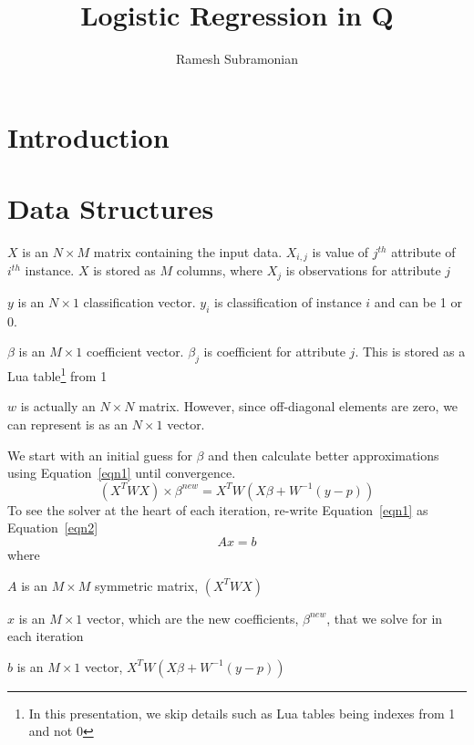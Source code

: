 \documentclass[12pt,timesnewroman,letterpaper]{article}
\begin{document}
\title{Logistic Regression in Q}
\author{ Ramesh Subramonian }
\maketitle
\thispagestyle{fancy}
\cfoot{}
\rfoot{{\small \thepage}}

\section{Introduction}

\TBC

\section{Data Structures}

\bi
\item \(X\) is an \(N \times M\) matrix containing the input data.
  \(X_{i, j}\) is value of \(j^{th}\) attribute of \(i^{th}\)
  instance. \(X\) is stored as \(M\) columns, where \(X_j\) is
  observations for attribute \(j\)
\item \(y\) is an \(N \times 1\) classification vector. \(y_i\) is
  classification of instance \(i\) and can be 1 or 0.
\item \(\beta\) is an \(M \times 1\) coefficient vector. \(\beta_j\)
  is coefficient for attribute \(j\). This is stored as a Lua table\footnote{In
    this presentation, we skip details such as Lua tables being indexes from 1
  and not 0}
  from 1
\item \(w\) is actually an \(N \times N\) matrix. However, since
  off-diagonal elements are zero, we can represent is as an \(N \times
  1\) vector.  \ei

We start with an initial guess for \(\beta\) and then calculate better
approximations using Equation~\ref{eqn1} until convergence.
\begin{equation}
\label{eqn1}
(X^T W X) \times \beta ^{new} = X^T W ( X \beta + W^{-1}(y - p) )
\end{equation}
To see the solver at the heart of each iteration, re-write Equation~\ref{eqn1} as Equation~\ref{eqn2}
\begin{equation}
\label{eqn2}
A x = b
\end{equation}
where 
\be
\item \(A\) is an \(M \times M\) symmetric matrix, \((X^T W X)\)
\item \(x\) is an \(M \times 1\) vector, which are the new
  coefficients, \(\beta^{new}\), that we solve for in each iteration
\item \(b\) is an \(M \times 1\) vector, \(X^T W ( X \beta + W^{-1}(y - p) )\)
\ee
\end{document}
